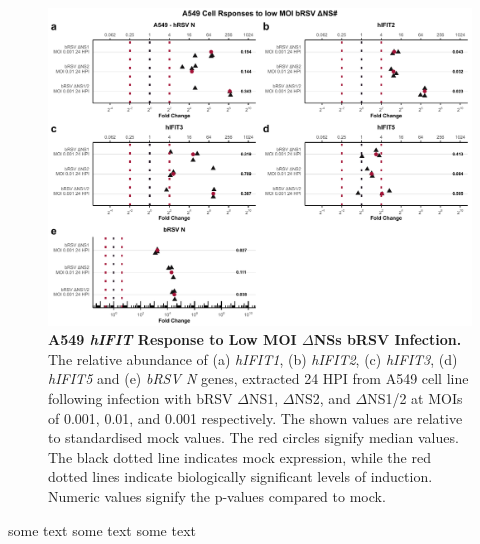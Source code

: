 \begin{figure}
    \centering
    \includegraphics[width=1\linewidth]{06. Chapter 1/Figs/01. Induction/08. a549_brsv_dns.pdf}
    \caption[A549 \textit{hIFIT} Response to Low MOI \(\Delta\)NSs bRSV Infection.]{\textbf{A549 \textit{hIFIT} Response to Low MOI \(\Delta\)NSs bRSV Infection.} The relative abundance of (a) \textit{hIFIT1}, (b) \textit{hIFIT2}, (c) \textit{hIFIT3}, (d) \textit{hIFIT5} and (e) \textit{bRSV N} genes, extracted 24 HPI from A549 cell line following infection with bRSV \(\Delta\)NS1, \(\Delta\)NS2, and \(\Delta\)NS1/2 at MOIs of 0.001, 0.01, and 0.001 respectively. The shown values are relative to standardised mock values. The red circles signify median values. The black dotted line indicates mock expression, while the red dotted lines indicate biologically significant levels of induction. Numeric values signify the p-values compared to mock.}
    \label{Responses of A549 to bRSV dNSs.}
\end{figure}

some text some text some text

